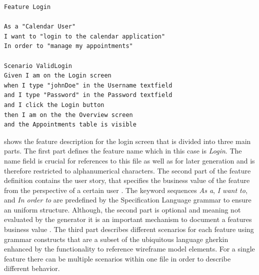 \documentclass{sig-alternate-05-2015}
\begin{document}
\begin{lstlisting}[captionpos=b, caption=Feature Description: Login Screen., label={lst:featureLogin}, language=dsl]
Feature Login

As a "Calendar User"
I want to "login to the calendar application"
In order to "manage my appointments"

Scenario ValidLogin
Given I am on the Login screen 
when I type "johnDoe" in the Username textfield 
and I type "Password" in the Password textfield 
and I click the Login button
then I am on the the Overview screen
and the Appointments table is visible
\end{lstlisting}

 shows the feature description for the login screen that is divided into three main parts. 
The first part defines the feature name which in this case is \textit{Login}.
The name field is crucial for references to this file as well as for later generation and is therefore restricted to alphanumerical characters.
The second part of the feature definition contains the user story, that specifies the business value of the feature from the perspective of a certain user \cite{C.Solis.2011}.
The keyword sequences \textit{As a}, \textit{I want to}, and \textit{In order to} are predefined by the Specification Language grammar to ensure an uniform structure.
Although, the second part is optional and meaning not evaluated by the generator it is an important mechanism to document a features business value \cite{RogerioAtemdeCarvalho.2010}.
The third part describes different scenarios for each feature using grammar constructs that are a subset of the ubiquitous language gherkin \cite{wynne2012cucumber} enhanced by the functionality to reference wireframe model elements.
For a single feature there can be multiple scenarios within one file in order to describe different behavior.
\end{document}
